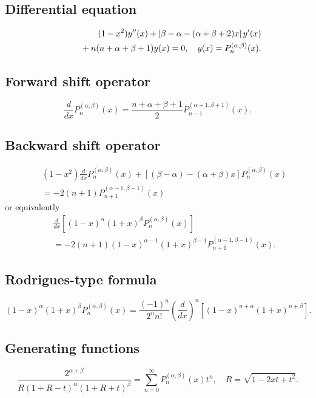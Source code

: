 \documentclass[envcountchap,graybox]{svmono}
\newcommand{\mathindent}{\hspace{7.5mm}}
\begin{document}
\subsection*{Differential equation}
\begin{eqnarray}
\label{dvJacobi}
& &(1-x^2)y''(x)+\left[\beta-\alpha-(\alpha+\beta+2)x\right]y'(x)\nonumber\\
& &{}\mathindent{}+n(n+\alpha+\beta+1)y(x)=0,\quad y(x)=P_n^{(\alpha,\beta)}(x).
\end{eqnarray}

\subsection*{Forward shift operator}
\begin{equation}
\label{shift1Jacobi}
\frac{d}{dx}P_n^{(\alpha,\beta)}(x)=\frac{n+\alpha+\beta+1}{2}P_{n-1}^{(\alpha+1,\beta+1)}(x).
\end{equation}

\subsection*{Backward shift operator}
\begin{eqnarray}
\label{shift2JacobiI}
& &(1-x^2)\frac{d}{dx}P_n^{(\alpha,\beta)}(x)+
\left[(\beta-\alpha)-(\alpha+\beta)x\right]P_n^{(\alpha,\beta)}(x)\nonumber\\
& &{}=-2(n+1)P_{n+1}^{(\alpha-1,\beta-1)}(x)
\end{eqnarray}
or equivalently
\begin{eqnarray}
\label{shift2JacobiII}
& &\frac{d}{dx}\left[(1-x)^\alpha(1+x)^\beta P_n^{(\alpha,\beta)}(x)\right]\nonumber\\
& &{}=-2(n+1)(1-x)^{\alpha-1}(1+x)^{\beta-1}P_{n+1}^{(\alpha-1,\beta-1)}(x).
\end{eqnarray}

\subsection*{Rodrigues-type formula}
\begin{equation}
\label{RodJacobi}
(1-x)^{\alpha}(1+x)^{\beta}P_n^{(\alpha,\beta)}(x)=
\frac{(-1)^n}{2^nn!}\left(\frac{d}{dx}\right)^n
\left[(1-x)^{n+\alpha}(1+x)^{n+\beta}\right].
\end{equation}

\subsection*{Generating functions}
\begin{equation}
\label{GenJacobi1}
\frac{2^{\alpha+\beta}}{R(1+R-t)^{\alpha}(1+R+t)^{\beta}}=
\sum_{n=0}^{\infty}P_n^{(\alpha,\beta)}(x)t^n,\quad R=\sqrt{1-2xt+t^2}.
\end{equation}
\end{document}
